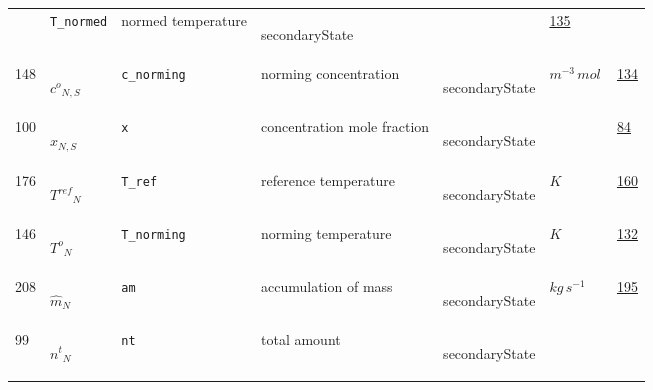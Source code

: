 \begin{longtable}{|p{1cm}|p{2.5cm}|p{4.5cm}|p{8cm}|p{3.0cm}|p{3cm}|p{1cm}|}
             & \verb|T_normed|
             & normed temperature
             & \begin{lay}secondaryState \end{lay}
             & $  $
             &                 \hyperlink{"e:135"}{ 135 }
                 \\
            148
             & \hypertarget{"v:148"}{ $ {{c^o}}{_{N, S}} $}
             & \verb|c_norming|
             & norming concentration
             & \begin{lay}secondaryState \end{lay}
             & $ m^{-3} \,mol \, $
             &                 \hyperlink{"e:134"}{ 134 }
                 \\
            100
             & \hypertarget{"v:100"}{ $ {x}{_{N, S}} $}
             & \verb|x|
             & concentration mole fraction
             & \begin{lay}secondaryState \end{lay}
             & $  $
             &                 \hyperlink{"e:84"}{ 84 }
                 \\
            176
             & \hypertarget{"v:176"}{ $ {{T^{ref}}}{_{N}} $}
             & \verb|T_ref|
             & reference temperature
             & \begin{lay}secondaryState \end{lay}
             & $ K \, $
             &                 \hyperlink{"e:160"}{ 160 }
                 \\
            146
             & \hypertarget{"v:146"}{ $ {{T^o}}{_{N}} $}
             & \verb|T_norming|
             & norming temperature
             & \begin{lay}secondaryState \end{lay}
             & $ K \, $
             &                 \hyperlink{"e:132"}{ 132 }
                 \\
            208
             & \hypertarget{"v:208"}{ $ {{\hat{m}}}{_{N}} $}
             & \verb|am|
             & accumulation of mass
             & \begin{lay}secondaryState \end{lay}
             & $ kg \,s^{-1} \, $
             &                 \hyperlink{"e:195"}{ 195 }
                 \\
            99
             & \hypertarget{"v:99"}{ $ {{n^t}}{_{N}} $}
             & \verb|nt|
             & total amount
             & \begin{lay}secondaryState \end{lay}

\end{longtable}
